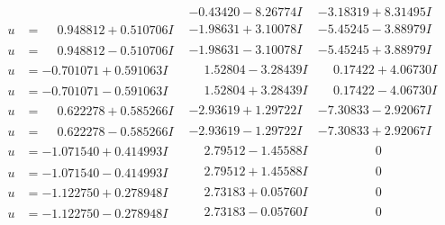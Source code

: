 \documentclass[1p]{elsarticle_modified}
\theoremstyle{definition}
\begin{document}
$$\begin{array}{c|c|c}
 & -0.43420 - 8.26774 I & -3.18319 + 8.31495 I \\ \hline\begin{aligned}
u &= \phantom{-}0.948812 + 0.510706 I\end{aligned}
 & -1.98631 + 3.10078 I & -5.45245 - 3.88979 I \\ \hline\begin{aligned}
u &= \phantom{-}0.948812 - 0.510706 I\end{aligned}
 & -1.98631 - 3.10078 I & -5.45245 + 3.88979 I \\ \hline\begin{aligned}
u &= -0.701071 + 0.591063 I\end{aligned}
 & \phantom{-}1.52804 - 3.28439 I & \phantom{-}0.17422 + 4.06730 I \\ \hline\begin{aligned}
u &= -0.701071 - 0.591063 I\end{aligned}
 & \phantom{-}1.52804 + 3.28439 I & \phantom{-}0.17422 - 4.06730 I \\ \hline\begin{aligned}
u &= \phantom{-}0.622278 + 0.585266 I\end{aligned}
 & -2.93619 + 1.29722 I & -7.30833 - 2.92067 I \\ \hline\begin{aligned}
u &= \phantom{-}0.622278 - 0.585266 I\end{aligned}
 & -2.93619 - 1.29722 I & -7.30833 + 2.92067 I \\ \hline\begin{aligned}
u &= -1.071540 + 0.414993 I\end{aligned}
 & \phantom{-}2.79512 - 1.45588 I & \phantom{-0.000000 } 0 \\ \hline\begin{aligned}
u &= -1.071540 - 0.414993 I\end{aligned}
 & \phantom{-}2.79512 + 1.45588 I & \phantom{-0.000000 } 0 \\ \hline\begin{aligned}
u &= -1.122750 + 0.278948 I\end{aligned}
 & \phantom{-}2.73183 + 0.05760 I & \phantom{-0.000000 } 0 \\ \hline\begin{aligned}
u &= -1.122750 - 0.278948 I\end{aligned}
 & \phantom{-}2.73183 - 0.05760 I & \phantom{-0.000000 } 0 \\ \hline\begin{aligned}

\end{aligned}
\end{array}$$
\end{document}
